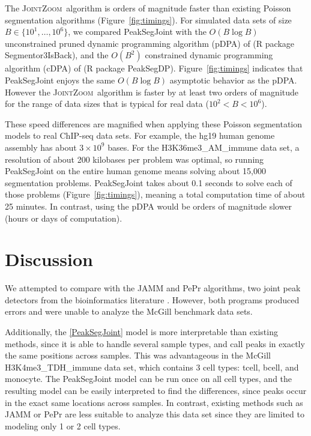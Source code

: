 \documentclass{article} %
\newcommand{\JointHeuristic}{\textsc{JointZoom}}
\begin{document}
The \JointHeuristic\ algorithm is orders of magnitude faster than
existing Poisson segmentation algorithms
(Figure~\ref{fig:timings}). For simulated data sets of size
$B\in\{10^1, \dots, 10^6\}$, we compared PeakSegJoint with the
$O(B\log B)$ unconstrained pruned dynamic programming algorithm (pDPA)
of \citet{Segmentor} (R package Segmentor3IsBack), and the $O(B^2)$
constrained dynamic programming algorithm (cDPA) of
\citet{HOCKING-PeakSeg} (R package
PeakSegDP). Figure~\ref{fig:timings} indicates that PeakSegJoint
enjoys the same $O(B \log B)$ asymptotic behavior as the pDPA. However
the \JointHeuristic\ algorithm is faster by at least two orders of
magnitude for the range of data sizes that is typical for real data
($10^2 < B < 10^6$).

These speed differences are magnified when applying these Poisson
segmentation models to real ChIP-seq data sets. For example, the hg19
human genome assembly has about $3\times 10^9$ bases. For the
H3K36me3\_AM\_immune data set, a resolution of about 200 kilobases per
problem was optimal, so running PeakSegJoint on the entire human
genome means solving about 15,000 segmentation problems. PeakSegJoint
takes about 0.1 seconds to solve each of those problems
(Figure~\ref{fig:timings}), meaning a total computation time of about
25 minutes. In contrast, using the pDPA would be orders of magnitude
slower (hours or days of computation).

\section{Discussion}
\label{sec:discussion}

We attempted to compare with the JAMM and PePr algorithms, two joint
peak detectors from the bioinformatics literature \citep{JAMM,
  PePr}. However, both programs produced errors and were unable to
analyze the McGill benchmark data sets. 


Additionally, the \ref{PeakSegJoint} model is more interpretable than
existing methods, since it is able to handle several sample types, and
call peaks in exactly the same positions across samples. This was
advantageous in the McGill H3K4me3\_TDH\_immune data set, which
contains 3 cell types: tcell, bcell, and monocyte. The PeakSegJoint
model can be run once on all cell types, and the resulting model can
be easily interpreted to find the differences, since peaks occur in
the exact same locations across samples. In contrast, existing methods
such as JAMM or PePr are less suitable to analyze this data set since
they are limited to modeling only 1 or 2 cell types.
\end{document}
